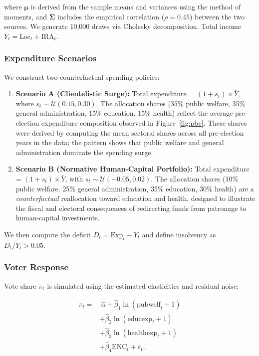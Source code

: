 \documentclass[twocolumn]{article}
\begin{document}
where $\boldsymbol{\mu}$ is derived from the sample means and variances using the method of moments, and $\boldsymbol{\Sigma}$ includes the empirical correlation ($\rho=0.45$) between the two sources. We generate 10,000 draws via Cholesky decomposition. Total income $Y_t = \text{Loc}_t + \text{IRA}_t$.

\subsubsection{Expenditure Scenarios}
We construct two counterfactual spending policies:

\begin{enumerate}
\item \textbf{Scenario A (Clientelistic Surge):} Total expenditure = $(1 + s_t) \times \bar{Y}$, where $s_t \sim \mathcal{U}(0.15,0.30)$. The allocation shares (35\% public welfare, 35\% general administration, 15\% education, 15\% health) reflect the average pre-election expenditure composition observed in Figure~\ref{fig:pbc}. These shares were derived by computing the mean sectoral shares across all pre-election years in the data; the pattern shows that public welfare and general administration dominate the spending surge.

\item \textbf{Scenario B (Normative Human-Capital Portfolio):} Total expenditure = $(1 + s_t) \times \bar{Y}$, with $s_t \sim \mathcal{U}(-0.05,0.02)$. The allocation shares (10\% public welfare, 25\% general administration, 35\% education, 30\% health) are a \emph{counterfactual} reallocation toward education and health, designed to illustrate the fiscal and electoral consequences of redirecting funds from patronage to human-capital investments.
\end{enumerate}

We then compute the deficit $D_t = \text{Exp}_t - Y_t$ and define insolvency as $D_t / Y_t > 0.05$.

\subsubsection{Voter Response}
Vote share $\pi_t$ is simulated using the estimated elasticities and residual noise:

\begin{equation}
\begin{aligned}
\pi_t = &\ \hat{\alpha} + \hat{\beta}_1 \ln(\text{pubwelf}_t+1) \\
&+ \hat{\beta}_2 \ln(\text{educexp}_t+1) \\
&+ \hat{\beta}_3 \ln(\text{healthexp}_t+1) \\
&+ \hat{\beta}_4 \text{ENC}_t + \varepsilon_t,
\end{aligned}
\end{equation}
\end{document}
